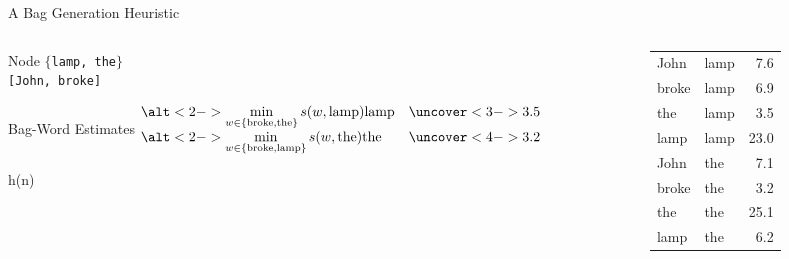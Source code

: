 \documentclass[14pt]{beamer}
\begin{document}
\begin{frame}[label=bag-generation-heuristic]{A Bag Generation Heuristic}
\begin{columns}
\begin{column}{0.6\textwidth}
\begin{block}{Node}
\texttt{$\{$lamp, the$\}$} \\
\texttt{[John, broke]}
\end{block}
\begin{block}{Bag-Word Estimates}
$
\begin{array}{@{} l l @{}}
\alt<2->%
{\min\limits_{w \in \{\mbox{\scriptsize broke}, \mbox{\scriptsize the}\}} s(w, \mbox{lamp})}
{\mbox{lamp}}
& \uncover<3->{3.5} \\
\alt<2->%
{\min\limits_{w \in \{\mbox{\scriptsize broke}, \mbox{\scriptsize lamp}\}} s(w, \mbox{the})}
{\mbox{the}}
& \uncover<4->{3.2} \\
\end{array}
$
\end{block}
\begin{block}{h(n)}
\end{block}
\end{column}
\begin{column}{0.35\textwidth}
\begin{tabular}{ @{} | l l r | @{}}
\hline
John  & lamp & 7.6 \\
broke & lamp & 6.9 \\
the   & lamp & 3.5 \\
lamp  & lamp & 23.0 \\
\hline
\hline
John  & the  & 7.1 \\
broke & the  & 3.2 \\
the   & the  & 25.1 \\
lamp  & the  & 6.2 \\
\hline
\end{tabular}
\end{column}
\end{columns}
\end{frame}
\end{document}

